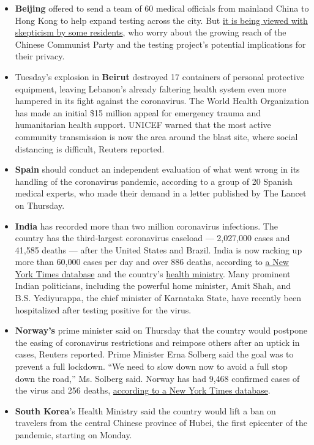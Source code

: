 \begin{itemize}
\item
  \textbf{Beijing} offered to send a team of 60 medical officials from
  mainland China to Hong Kong to help expand testing across the city.
  But
  \href{https://www.nytimes3xbfgragh.onion/2020/08/06/business/hong-kong-china-coronavirus-testing.html}{it
  is being viewed with skepticism by some residents}, who worry about
  the growing reach of the Chinese Communist Party and the testing
  project's potential implications for their privacy.
\item
  Tuesday's explosion in \textbf{Beirut} destroyed 17 containers of
  personal protective equipment, leaving Lebanon's already faltering
  health system even more hampered in its fight against the coronavirus.
  The World Health Organization has made an initial \$15 million appeal
  for emergency trauma and humanitarian health support. UNICEF warned
  that the most active community transmission is now the area around the
  blast site, where social distancing is difficult, Reuters reported.
\item
  \textbf{Spain} should conduct an independent evaluation of what went
  wrong in its handling of the coronavirus pandemic, according to a
  group of 20 Spanish medical experts, who made their demand in a letter
  published by The Lancet on Thursday.
\item
  \textbf{India} has recorded more than two million coronavirus
  infections. The country has the third-largest coronavirus caseload ---
  2,027,000 cases and 41,585 deaths --- after the United States and
  Brazil. India is now racking up more than 60,000 cases per day and
  over 886 deaths, according to
  \href{https://www.nytimes3xbfgragh.onion/interactive/2020/world/asia/india-coronavirus-cases.html}{a
  New York Times database} and the country's
  \href{https://www.mohfw.gov.in/}{health ministry}. Many prominent
  Indian politicians, including the powerful home minister, Amit Shah,
  and B.S. Yediyurappa, the chief minister of Karnataka State, have
  recently been hospitalized after testing positive for the virus.
\end{itemize}

\begin{itemize}
\item
  \textbf{Norway's} prime minister said on Thursday that the country
  would postpone the easing of coronavirus restrictions and reimpose
  others after an uptick in cases, Reuters reported. Prime Minister Erna
  Solberg said the goal was to prevent a full lockdown. ``We need to
  slow down now to avoid a full stop down the road,'' Ms. Solberg said.
  Norway has had 9,468 confirmed cases of the virus and 256 deaths,
  \href{https://www.nytimes3xbfgragh.onion/interactive/2020/world/coronavirus-maps.html}{according
  to a New York Times database}.
\item
  \textbf{South Korea}'s Health Ministry said the country would lift a
  ban on travelers from the central Chinese province of Hubei, the first
  epicenter of the pandemic, starting on Monday.
\end{itemize}

